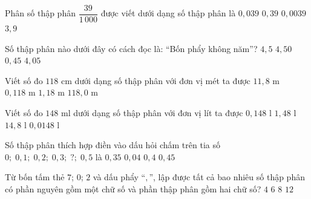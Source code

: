 \begin{ex} %
Phân số thập phân $\dfrac{39}{1\,000}$ được viết dưới dạng số thập phân là
\choice
{\True $0{,}039$}
{$0{,}39$}
{$0{,}0039$}
{$3{,}9$}
\end{ex}

\begin{ex} %
Số thập phân nào dưới đây có cách đọc là: ``Bốn phẩy không năm''?
\choice
{$4{,}5$}
{$4{,}50$}
{$0{,}45$}
{\True $4{,}05$}
\end{ex}

\begin{ex} %
Viết số đo $118\text{ cm}$ dưới dạng số thập phân với đơn vị mét ta được
\choice
{$11{,}8\text{ m}$}
{$0{,}118\text{ m}$}
{\True $1{,}18\text{ m}$}
{$118{,}0\text{ m}$}
\end{ex}

\begin{ex} %
Viết số đo $148\text{ ml}$ dưới dạng số thập phân với đơn vị lít ta được
\choice
{\True $0{,}148\text{ l}$}
{$1{,}48\text{ l}$}
{$14{,}8\text{ l}$}
{$0{,}0148\text{ l}$}
\end{ex}

\begin{ex} %
Số thập phân thích hợp điền vào dấu hỏi chấm trên tia số $0;\; 0{,}1;\; 0{,}2;\; 0{,}3;\; ?;\; 0{,}5$ là
\choice
{$0{,}35$}
{$0{,}04$}
{\True $0{,}4$}
{$0{,}45$}
\end{ex}

\begin{ex} %
Từ bốn tấm thẻ $7$; $0$; $2$ và dấu phẩy ``$,$'', lập được tất cả bao nhiêu số thập phân có phần nguyên gồm một chữ số và phần thập phân gồm hai chữ số?
\choice
{$4$}
{\True $6$}
{$8$}
{$12$}
\end{ex}

